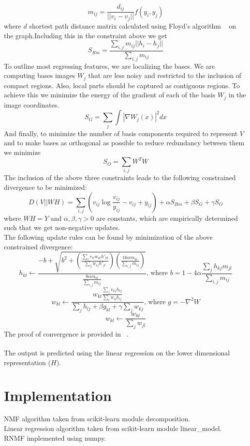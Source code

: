 \documentclass[12pt]{article}
\begin{document}
	$$m_{ij} = \frac{d_{ij}}{||v_{i} - v_{j}||}f(y_{i},y_{j})$$
	where $d$ shortest path distance matrix calculated using Floyd's algorithm ~\cite{Cormen} on the graph.Including this in the constraint above we get
	$$S_{Rm} = \frac{\sum_{i,j}m_{ij}||h_{i} - h_{j}||}{\sum_{i,j}m_{ij}}$$
	To outline most regressing features, we are localizing the bases. We are computing bases images $W_{j}$ that are less noisy and restricted to the inclusion of compact regions. Also, local parts should be captured as contiguous regions. To achieve this we minimize the energy of the gradient of each of the basis $W_{j}$ in the image coordinates.
	$$S_{G} = \sum_{j}\int|\nabla W_{j}(x)|^{2}dx$$
	And finally, to minimize the number of basis components required to represent $V$ and to make bases as orthogonal as possible to reduce redundancy between them we minimize ~\cite{Li}
	$$S_O = \sum_{i,j}W^{T}W$$
	The inclusion of the above three constraints leads to the following constrained divergence to be minimized: 
	$$D(V||WH) = \sum_{i,j}(v_{ij}\log{\frac{v_{ij}}{y_{ij}} - v_{ij} + y_{ij}}) + \alpha S_{Rm} + \beta S_{G} + \gamma S_{O}$$
	where $WH = Y$ and $\alpha, \beta, \gamma > 0$ are constants, which are empirically determined such that we get non-negative updates.\\
	The following update rules can be found by minimization of the above constrained divergence:
	$$h_{kl} \leftarrow \frac{-b + \sqrt{b^{2} + (\frac{\sum_{i}v_{il}w_{ik}h'_{kl}}{\sum_{j}w_{ij}h'_{jl}})(\frac{16\alpha m_{kl}}{\sum_{i,j}m_{ij}})}}{\frac{8\alpha m_{kl}}{\sum_{i,j}m_{ij}}} \text{, where } b = 1 - 4\alpha\frac{\sum_{j}h_{kj}m_{jl}}{\sum_{i,j}m_{ij}}$$
	$$w_{kl} \leftarrow \frac{w_{kl}\frac{\sum_{j}v_{kj}h_{lj}}{\sum_{i}w_{il}h_{lj}}}{\sum_{j}h_{lj} + \beta g_{kl} + \gamma \sum_{j}w_{kj}} \text{, where } g = -\nabla^{2}W$$
	$$w_{kl} \leftarrow \frac{w_{kl}}{\sum_{j}w_{jl}}$$
	The proof of convergence is provided in ~\cite{Joshi}.\\\\
	The output is predicted using the linear regression on the lower dimensional representation ($H$).

\section{Implementation}

	NMF algorithm taken from scikit-learn module decomposition.\\
	Linear regression algorithm taken from scikit-learn module linear\_model.\\
	RNMF implemented using numpy.\\
\end{document}
